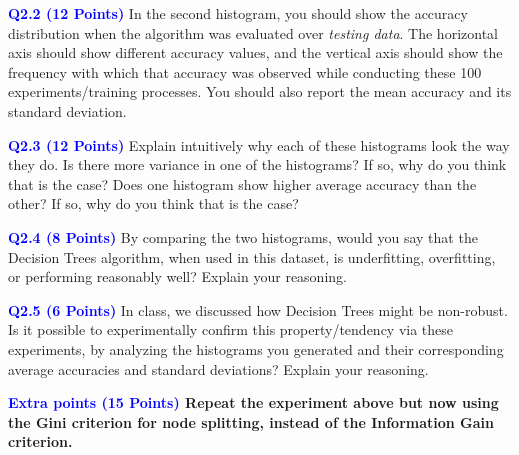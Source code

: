 \documentclass[]{article}
\newcommand{\HIGHLIGHT}[1]{\textcolor{blue}{\textbf{#1}}}
\begin{document}
\begin{enumerate}
    
    
    \HIGHLIGHT{Q2.2 (12 Points)} In the second histogram, you should show the accuracy distribution when the algorithm was evaluated over \textit{testing data}. The horizontal axis should show different accuracy values, and the vertical axis should show the frequency with which that accuracy was observed while conducting these 100 experiments/training processes. You should also report the mean accuracy and its standard deviation.    
    

    \HIGHLIGHT{Q2.3 (12 Points)} Explain intuitively why each of these histograms look the way they do. Is there more variance in one of the histograms? If so, why do you think that is the case? Does one histogram show higher average accuracy than the other? If so, why do you think that is the case?

    
    \HIGHLIGHT{Q2.4 (8 Points)} By comparing the two histograms, would you say that the Decision Trees algorithm, when used in this dataset, is underfitting, overfitting, or performing reasonably well? Explain your reasoning.

    
    \HIGHLIGHT{Q2.5 (6 Points)} In class, we discussed how Decision Trees might be non-robust. Is it possible to experimentally confirm this property/tendency via these experiments, by analyzing the histograms you generated and their corresponding average accuracies and standard deviations? Explain your reasoning.
    
    \vspace{0.25in}
    \textbf{\HIGHLIGHT{Extra points (15 Points)} Repeat the experiment above but now using the Gini criterion for node splitting, instead of the Information Gain criterion.}
    
\end{enumerate}
\end{document}
